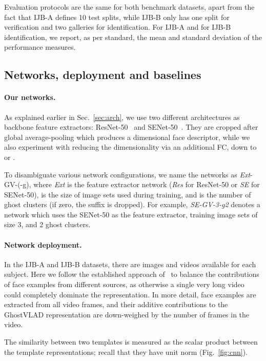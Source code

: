 \documentclass[runningheads]{llncs}
\begin{document}
Evaluation protocols are the same for both 
benchmark datasets, apart from the fact that
IJB-A defines 10 test splits,
while IJB-B only has one split for verification
and two galleries for identification.
For IJB-A and for IJB-B identification, we report,
as per standard, the mean and standard deviation of
the performance measures.




\subsection{Networks, deployment and baselines}

\paragraph{Our networks.}
As explained earlier in Sec.~\ref{sec:arch},
we use two different
architectures as backbone feature extractors:
ResNet-50~\cite{He16} 
and SENet-50~\cite{Hu18}.
They are cropped after global average-pooling
which produces a  dimensional face descriptor,
while we also experiment with reducing the dimensionality
via an additional FC, down to  or .

To disambiguate various network configurations,
we name the networks as \emph{Ext}-GV-(-g),
where \emph{Ext} is the feature extractor network
(\emph{Res} for ResNet-50 or \emph{SE} for SENet-50),
 is the size of image sets used during training,
and  is the number of ghost clusters (if zero,
the suffix is dropped).
For example, \emph{SE-GV-3-g2} denotes a network which uses
the SENet-50 as the feature extractor,
training image sets of size 3, and
2 ghost clusters.


\paragraph{Network deployment.}
In the IJB-A and IJB-B datasets, there are images and
videos available for each subject.
Here we follow the established approach of~\cite{Cao18,Crosswhite17}
to balance the contributions of face examples from
different sources, as otherwise a single very long video could
completely dominate the representation.
In more detail, face examples are extracted from
all video frames, and their additive contributions
to the GhostVLAD representation are down-weighed by
the number of frames in the video.


The similarity between two templates is measured as the
scalar product between the template representations;
recall that they have unit norm (Fig.~\ref{fig:cnn}).
\end{document}
